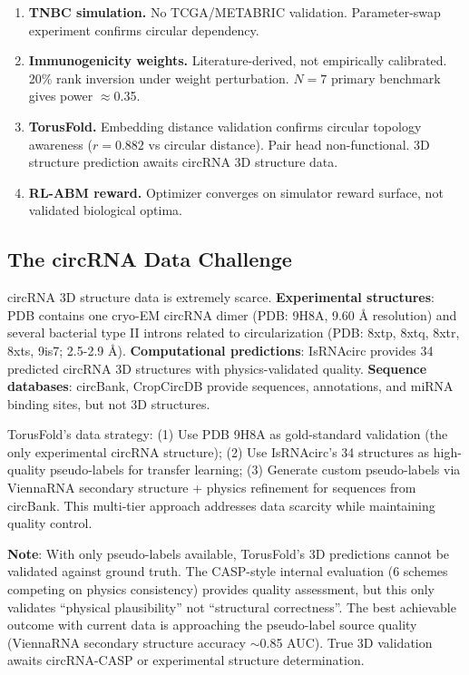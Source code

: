 \documentclass[11pt,a4paper]{article}
\begin{document}
\begin{enumerate}
\item \textbf{TNBC simulation.} No TCGA/METABRIC validation. Parameter-swap experiment confirms circular dependency.

\item \textbf{Immunogenicity weights.} Literature-derived, not empirically calibrated. 20\% rank inversion under weight perturbation. $N=7$ primary benchmark gives power $\approx$0.35.

\item \textbf{TorusFold.} Embedding distance validation confirms circular topology awareness ($r=0.882$ vs circular distance). Pair head non-functional. 3D structure prediction awaits circRNA 3D structure data.

\item \textbf{RL-ABM reward.} Optimizer converges on simulator reward surface, not validated biological optima.
\end{enumerate}

\subsection{The circRNA Data Challenge}

circRNA 3D structure data is extremely scarce. \textbf{Experimental structures}: PDB contains one cryo-EM circRNA dimer (PDB: 9H8A, 9.60 Å resolution) and several bacterial type II introns related to circularization (PDB: 8xtp, 8xtq, 8xtr, 8xts, 9is7; 2.5-2.9 Å). \textbf{Computational predictions}: IsRNAcirc \citep{jiang2024isrnacirc} provides 34 predicted circRNA 3D structures with physics-validated quality. \textbf{Sequence databases}: circBank, CropCircDB provide sequences, annotations, and miRNA binding sites, but not 3D structures.

TorusFold's data strategy: (1) Use PDB 9H8A as gold-standard validation (the only experimental circRNA structure); (2) Use IsRNAcirc's 34 structures as high-quality pseudo-labels for transfer learning; (3) Generate custom pseudo-labels via ViennaRNA secondary structure + physics refinement for sequences from circBank. This multi-tier approach addresses data scarcity while maintaining quality control.

\textbf{Note}: With only pseudo-labels available, TorusFold's 3D predictions cannot be validated against ground truth. The CASP-style internal evaluation (6 schemes competing on physics consistency) provides quality assessment, but this only validates ``physical plausibility'' not ``structural correctness''. The best achievable outcome with current data is approaching the pseudo-label source quality (ViennaRNA secondary structure accuracy $\sim$0.85 AUC). True 3D validation awaits circRNA-CASP or experimental structure determination.
\end{document}
